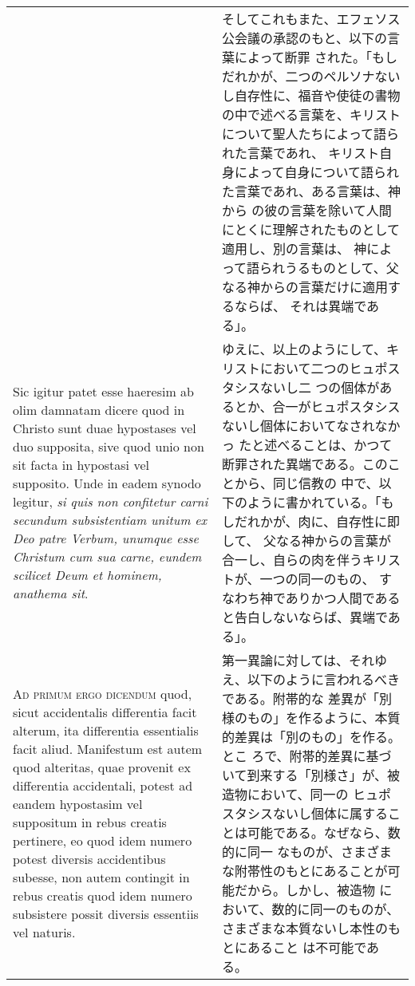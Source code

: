 \documentclass[10pt]{jsarticle} %
\begin{document}
\begin{longtable}{p{21em}p{21em}}
&

そしてこれもまた、エフェソス公会議の承認のもと、以下の言葉によって断罪
された。「もしだれかが、二つのペルソナないし自存性に、福音や使徒の書物
の中で述べる言葉を、キリストについて聖人たちによって語られた言葉であれ、
キリスト自身によって自身について語られた言葉であれ、ある言葉は、神から
の彼の言葉を除いて人間にとくに理解されたものとして適用し、別の言葉は、
神によって語られうるものとして、父なる神からの言葉だけに適用するならば、
それは異端である」。

\\


Sic igitur patet esse haeresim ab olim damnatam dicere quod in Christo
sunt duae hypostases vel duo supposita, sive quod unio non sit facta
in hypostasi vel supposito. Unde in eadem synodo legitur, {\itshape si
quis non confitetur carni secundum subsistentiam unitum ex Deo patre
Verbum, unumque esse Christum cum sua carne, eundem scilicet Deum et
hominem, anathema sit}.

&

ゆえに、以上のようにして、キリストにおいて二つのヒュポスタシスないし二
つの個体があるとか、合一がヒュポスタシスないし個体においてなされなかっ
たと述べることは、かつて断罪された異端である。このことから、同じ信教の
中で、以下のように書かれている。「もしだれかが、肉に、自存性に即して、
父なる神からの言葉が合一し、自らの肉を伴うキリストが、一つの同一のもの、
すなわち神でありかつ人間であると告白しないならば、異端である」。


\\





{\scshape Ad primum ergo dicendum} quod, sicut accidentalis
differentia facit alterum, ita differentia essentialis facit
aliud. Manifestum est autem quod alteritas, quae provenit ex
differentia accidentali, potest ad eandem hypostasim vel suppositum in
rebus creatis pertinere, eo quod idem numero potest diversis
accidentibus subesse, non autem contingit in rebus creatis quod idem
numero subsistere possit diversis essentiis vel naturis.


&

第一異論に対しては、それゆえ、以下のように言われるべきである。附帯的な
差異が「別様のもの」を作るように、本質的差異は「別のもの」を作る。とこ
ろで、附帯的差異に基づいて到来する「別様さ」が、被造物において、同一の
ヒュポスタシスないし個体に属することは可能である。なぜなら、数的に同一
なものが、さまざまな附帯性のもとにあることが可能だから。しかし、被造物
において、数的に同一のものが、さまざまな本質ないし本性のもとにあること
は不可能である。


\end{longtable}
\end{document}
